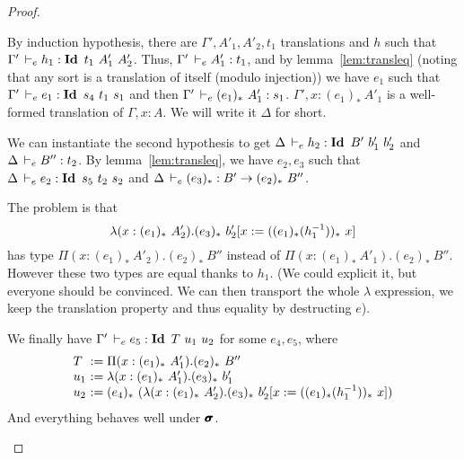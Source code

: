 \documentclass[a4paper,english]{lipics-utf8x}
\begin{document}
\begin{proof}
\begin{caselist}
      \nextcase
      \begin{mathc}
      \end{mathc}
      By induction hypothesis, there are $\Gamma',A'_1,A'_2,t_1$ translations
      and $h$ such that $\Gamma' \,\vdash_e h_1 : \operatorname{\mathbf{Id}~} t_1\ A'_1\ A'_2$.
      Thus, $\Gamma' \,\vdash_e A'_1 : t_1$, and by lemma~\ref{lem:transleq}
      (noting that any sort is a translation of itself (modulo injection))
      we have $e_1$ such that $\Gamma' \,\vdash_e e_1 : \operatorname{\mathbf{Id}~} s_4\ t_1\ s_1$ and
      then $\Gamma' \,\vdash_e (e_1)_*\ A'_1 : s_1$.
      $\Gamma', x : (e_1)_*\ A'_1$ is a well-formed translation of
      $\Gamma, x:A$. We will write it $\Delta$ for short.

      We can instantiate the second hypothesis to get
      $\Delta \,\vdash_e h_2 : \operatorname{\mathbf{Id}~} B'\ b'_1\ b'_2$ and $\Delta \,\vdash_e B'' : t_2$.
      By lemma~\ref{lem:transleq}, we have $e_2,e_3$ such that
      $\Delta \,\vdash_e e_2 : \operatorname{\mathbf{Id}~} s_5\ t_2\ s_2$ and
      $\Delta \,\vdash_e (e_3)_* : B' \to (e_2)_*\ B''$.

      The problem is that
      \[
        \lambda (x : (e_1)_*\ A'_2). (e_3)_*\ b'_2[x := ((e_1)_* (h_1^{-1}))_*\ x]
      \]
      has type
      $\Pi (x : (e_1)_*\ A'_2). (e_2)_*\ B''$ instead of
      $\Pi (x : (e_1)_*\ A'_1). (e_2)_*\ B''$.
      However these two types are equal thanks to $h_1$.
      (We could explicit it, but everyone should be convinced. We can then
      transport the whole $\lambda$ expression, we keep the translation
      property and thus equality by destructing $e$).

      We finally have
      $\Gamma' \,\vdash_e e_5 : \operatorname{\mathbf{Id}~} T\ u_1\ u_2$ for some $e_4,e_5$,
      where
      \[
        \begin{array}{l@{~}l}
          T   &:= \Pi (x : (e_1)_*\ A'_1). (e_2)_*\ B'' \\
          u_1 &:= \lambda (x : (e_1)_*\ A'_1). (e_3)_*\ b'_1 \\
          u_2 &:= (e_4)_*\ %
                   (\lambda (x : (e_1)_*\ A'_2).
                    (e_3)_*\ b'_2[x := ((e_1)_* (h_1\inv))_*\ x])
        \end{array}
      \]
      And everything behaves well under $\operatorname{\pmb{\bm{\sigma}}}$.


\end{caselist}
\end{proof}
\end{document}
